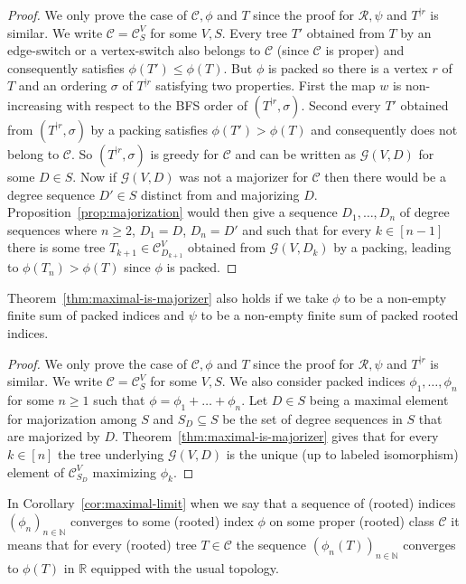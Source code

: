 \documentclass[11 pt]{modarticle}
\newcommand{\cN}{\mathbb{N}}
\newcommand{\cR}{\mathbb{R}}
\newcommand{\wmap}{w}
\newcommand{\rtree}[2]{{#1}^{\lvert #2}}
\newcommand{\ortree}[3]{(\rtree{#1}{#2},{#3})}
\newcommand{\tclass}{\mathcal{C}}
\newcommand{\rtclass}{\mathcal{R}}
\newcommand{\smallpclass}[2]{\tclass^{#1}_{#2}}
\newcommand{\greedy}[2]{\mathcal{G}(#1,#2)}
\newcommand{\pclass}[2]{\tclass^{#1}_{#2}}
\begin{document}
\begin{proof}
We only prove the case of $\tclass, \phi$ and $T$ since the proof for $\rtclass, \psi$ and $\rtree{T}{r}$ is similar. We write $\tclass = \pclass{V}{S}$ for some $V,S$. Every tree $T'$ obtained from $T$ by an edge-switch or a vertex-switch also belongs to $\tclass$ (since $\tclass$ is proper) and consequently satisfies $\phi(T') \leq \phi(T)$. But $\phi$ is packed so there is a vertex $r$ of $T$ and an ordering $\sigma$ of $\rtree{T}{r}$ satisfying two properties. First the map $\wmap$ is non-increasing with respect to the BFS order of $\ortree{T}{r}{\sigma}$. Second every $T'$ obtained from $\ortree{T}{r}{\sigma}$ by a packing satisfies $\phi(T') > \phi(T)$ and consequently does not belong to $\tclass$. So $\ortree{T}{r}{\sigma}$ is greedy for $\tclass$ and can be written as $\greedy{V}{D}$ for some $D \in S$. Now if $\greedy{V}{D}$ was not a majorizer for $\tclass$ then there would be a degree sequence $D' \in S$ distinct from and majorizing $D$. Proposition~\ref{prop:majorization} would then give a sequence $D_1, \dots, D_n$ of degree sequences where $n \geq 2$, $D_1 = D$, $D_n = D'$ and such that for every $k \in [n-1]$ there is some tree $T_{k+1} \in \pclass{V}{D_{k+1}}$ obtained from $\greedy{V}{D_k}$ by a packing, leading to $\phi(T_n) > \phi(T)$ since $\phi$ is packed.
\end{proof}


\begin{cor}\label{cor:maximal-finite-sum}
Theorem~\ref{thm:maximal-is-majorizer} also holds if we take $\phi$ to be a non-empty finite sum of packed indices and $\psi$ to be a non-empty finite sum of packed rooted indices.
\end{cor}

\begin{proof}
We only prove the case of $\tclass, \phi$ and $T$ since the proof for $\rtclass, \psi$ and $\rtree{T}{r}$ is similar.  We write $\tclass = \pclass{V}{S}$ for some $V,S$. We also consider packed indices $\phi_1, \dots, \phi_n$ for some $n \geq 1$ such that $\phi = \phi_1 + \dots + \phi_n$. Let $D \in S$ being a maximal element for majorization among $S$ and $S_D \subseteq S$ be the set of degree sequences in $S$ that are majorized by $D$. Theorem~\ref{thm:maximal-is-majorizer} gives that for every $k \in [n]$ the tree underlying $\greedy{V}{D}$ is the unique (up to labeled isomorphism) element of $\smallpclass{V}{S_D}$ maximizing $\phi_k$.
\end{proof}

In Corollary~\ref{cor:maximal-limit} when we say that a sequence of (rooted) indices $(\phi_n)_{n \in \cN}$ converges to some (rooted) index $\phi$ on some proper (rooted) class $\tclass$ it means that for every (rooted) tree $T \in \tclass$ the sequence $(\phi_n(T))_{n \in \cN}$ converges to $\phi(T)$ in $\cR$ equipped with the usual topology.
\end{document}
